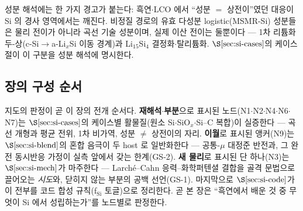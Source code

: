성분 해석에는 한 가지 경고가 붙는다: 흑연$\cdot$LCO 에서 ``성분 $=$ 상전이''였던 대응이 Si 의 경사
영역에서는 깨진다. 비정질 경로의 유효 다성분 logistic(MSMR-Si) 성분들은 물리 전이가 아니라 곡선 기술
성분이며, 실제 이산 전이는 둘뿐이다 --- 1차 리튬화 두-상(c-Si$\to$a-Li$_x$Si 이동 경계)과
Li$_{15}$Si$_4$ 결정화$\cdot$탈리튬화. $\S\ref{sec:si-cases}$의 케이스 절이 이 구분을 성분 해석에 명시한다.

\subsection{장의 구성 순서}\label{ssec:si-guide}
지도의 판정이 곧 이 장의 전개 순서다. \textbf{재해석$\cdot$부분}으로 표시된 노드(N1$\cdot$N2$\cdot$N4$\cdot$N6$\cdot$N7)는
$\S\ref{sec:si-cases}$의 케이스별 활물질(원소 Si$\cdot$SiO$_x$$\cdot$Si--C 복합)이 실증한다 --- 곡선 개형과
평균 전위, 1차 비가역, 성분 $\ne$ 상전이의 자리. \textbf{이월}로 표시된 앵커(N9)는 $\S\ref{sec:si-blend}$의
혼합 음극이 두 host 로 일반화한다 --- 공통-$\mu$ 대정준 반전과, 그 완전 동시반응 가정이 실측 앞에서 갖는
한계(GS-2). \textbf{새 물리}로 표시된 단 하나(N3)는 $\S\ref{sec:si-mech}$가 마주한다 ---
Larch\'e--Cahn 응력--화학퍼텐셜 결합을 골격 문법으로 끌어오는 \emph{시도}와, 닫히지 않는 부분의 공백
선언(GS-1). 마지막으로 $\S\ref{sec:si-code}$가 이 전부를 코드 합성 규칙(f$_\mathrm{Si}$ 토글)으로
정리한다. 곧 본 장은 ``흑연에서 배운 것 중 무엇이 Si 에서 성립하는가''를 노드별로 판정한다.

